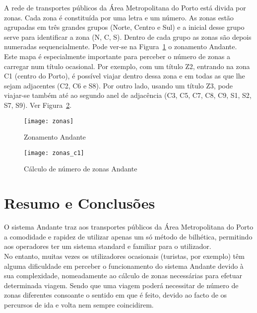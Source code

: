 A rede de transportes públicos da Área Metropolitana do Porto está divida por zonas. Cada zona é constituída por uma letra e um número. As zonas estão agrupadas em três grandes grupos (Norte, Centro e Sul) e a inicial desse grupo serve para identificar a zona (N, C, S). Dentro de cada grupo as zonas são depois numeradas sequencialmente. Pode ver-se na Figura~\ref{fig:zonas} o zonamento Andante.
\\Este mapa é especialmente importante para perceber o número de zonas a carregar num título ocasional. Por exemplo, com um título Z2, entrando na zona C1 (centro do Porto), é possível viajar dentro dessa zona e em todas as que lhe sejam adjacentes (C2, C6 e S8). Por outro lado, usando um título Z3, pode viajar-se também até ao segundo anel de adjacência (C3, C5, C7, C8, C9, S1, S2, S7, S9). Ver Figura~\ref{fig:zonas_c1}.

\begin{figure}[t]
  \begin{center}
    \leavevmode
    \texttt{[image: zonas]}
    \caption{Zonamento Andante}
    \label{fig:zonas}
  \end{center}
\end{figure}

\begin{figure}[t]
  \begin{center}
    \leavevmode
    \texttt{[image: zonas\_c1]}
    \caption{Cálculo de número de zonas Andante \cite{calczonas}}
    \label{fig:zonas_c1}
  \end{center}
\end{figure}

\section{Resumo e Conclusões}

O sistema Andante traz aos transportes públicos da Área Metropolitana do Porto a comodidade e rapidez de utilizar apenas um só método de bilhética, permitindo aos operadores ter um sistema standard e familiar para o utilizador.
\\No entanto, muitas vezes os utilizadores ocasionais (turistas, por exemplo) têm alguma dificuldade em perceber o funcionamento do sistema Andante devido à sua complexidade, nomeadamente ao cálculo de zonas necessárias para efetuar determinada viagem. Sendo que uma viagem poderá necessitar de número de zonas diferentes consoante o sentido em que é feito, devido ao facto de os percursos de ida e volta nem sempre coincidirem.
